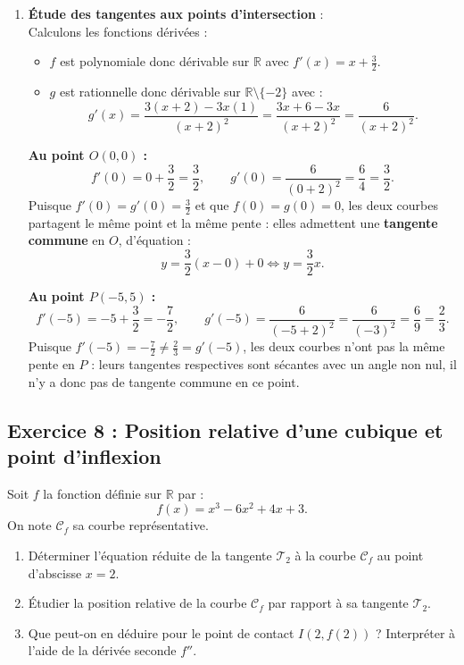\documentclass[11pt,a4paper]{article}
\newcommand{\R}{\mathbb{R}}
\begin{document}
\begin{correctionbox}
\begin{enumerate}[label=\textbf{\arabic*.}]
    \item \textbf{Étude des tangentes aux points d'intersection} :\\
    Calculons les fonctions dérivées :
    \begin{itemize}
        \item $f$ est polynomiale donc dérivable sur $\R$ avec $f'(x) = x + \frac{3}{2}$.
        \item $g$ est rationnelle donc dérivable sur $\R \setminus \{-2\}$ avec :
        \[
        g'(x) = \frac{3(x+2) - 3x(1)}{(x+2)^2} = \frac{3x + 6 - 3x}{(x+2)^2} = \frac{6}{(x+2)^2}.
        \]
    \end{itemize}

    \textbf{Au point $O(0, 0)$ :}
    \[
    f'(0) = 0 + \frac{3}{2} = \frac{3}{2}, \qquad g'(0) = \frac{6}{(0+2)^2} = \frac{6}{4} = \frac{3}{2}.
    \]
    Puisque $f'(0) = g'(0) = \frac{3}{2}$ et que $f(0) = g(0) = 0$, les deux courbes partagent le même point et la même pente : elles admettent une \textbf{tangente commune} en $O$, d'équation :
    \[
    y = \frac{3}{2}(x - 0) + 0 \iff y = \frac{3}{2}x.
    \]

    \textbf{Au point $P(-5, 5)$ :}
    \[
    f'(-5) = -5 + \frac{3}{2} = -\frac{7}{2}, \qquad g'(-5) = \frac{6}{(-5+2)^2} = \frac{6}{(-3)^2} = \frac{6}{9} = \frac{2}{3}.
    \]
    Puisque $f'(-5) = -\frac{7}{2} \neq \frac{2}{3} = g'(-5)$, les deux courbes n'ont pas la même pente en $P$ : leurs tangentes respectives sont sécantes avec un angle non nul, il n'y a donc pas de tangente commune en ce point.
\end{enumerate}
\end{correctionbox}

\subsection*{Exercice 8 : Position relative d'une cubique et point d'inflexion}

Soit $f$ la fonction définie sur $\R$ par :
\[
f(x) = x^3 - 6x^2 + 4x + 3.
\]
On note $\mathcal{C}_f$ sa courbe représentative.
\begin{enumerate}[label=\textbf{\arabic*.}]
    \item Déterminer l'équation réduite de la tangente $\mathcal{T}_2$ à la courbe $\mathcal{C}_f$ au point d'abscisse $x = 2$.
    \item Étudier la position relative de la courbe $\mathcal{C}_f$ par rapport à sa tangente $\mathcal{T}_2$.
    \item Que peut-on en déduire pour le point de contact $I(2, f(2))$ ? Interpréter à l'aide de la dérivée seconde $f''$.
\end{enumerate}
\end{document}
